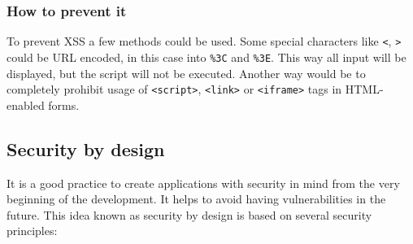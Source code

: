\documentclass[a4paper]{article}
\begin{document}
\subsubsection{How to prevent it}

To prevent XSS a few methods could be used. Some special characters like
\texttt{<}, \texttt{>} could be URL encoded, in this case into \texttt{\%3C} and
\texttt{\%3E}. This way all input will be displayed, but the script will not be
executed. Another way would be to completely prohibit usage of
\texttt{<script>}, \texttt{<link>} or \texttt{<iframe>} tags in HTML-enabled
forms.

\subsection{Security by design}

It is a good practice to create applications with security in mind from the very
beginning of the development. It helps to avoid having vulnerabilities in the
future. This idea known as security by design is based on several security
principles:
\end{document}
